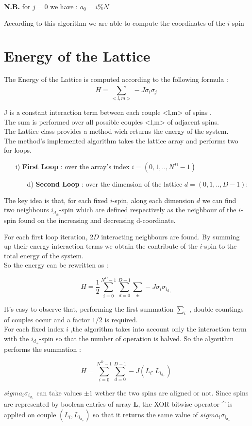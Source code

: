 \documentclass[11]{article}
\begin{document}
\textbf{N.B.} for $j=0$ we have : $a_0 = i\%N$	

According to this algorithm we are able to compute the coordinates of the $i$-spin


 
\section*{Energy of the Lattice} 

The Energy of the Lattice is computed according to the following formula : 
$$H = \sum_{<l,m>}^{} -J\sigma_i\sigma_j $$

\tab J is a constant interaction term between each couple <l,m> of spins .\\
\tab The sum is performed over all possible couples <l,m> of adjacent spins.\\

The Lattice class provides a method wich returns the energy of the system. \\
The method's implemented algorithm takes the lattice array and performs two for loops. \\
\begin{enumerate}
\item[i)] \textbf{First Loop} : over the array's index $i = (0,1,..,N^D-1)$ 
	\begin{enumerate}
	\item[d)] \textbf{Second Loop} : over the dimension of the lattice $d = (0,1,..,D-1)$: 
	\end{enumerate}	
\end{enumerate}


The key idea is that, for each fixed $i$-spin, along each dimension $d$ we can find two neighbours $i_{d_\pm}$-spin which are defined respectively as the neighbour of the $i$-spin found on the increasing and decreasing d-coordinate.   

For each first loop iteration, $2D$ interacting neighbours are found. By summing up their energy interaction terms we obtain the contribute of the $i$-spin to the total energy of the system. \\
So the energy can be rewritten as : 

$$H = \frac{1}{2}\sum_{i=0}^{N^D-1}\sum_{d=0}^{D-1}\sum_{\pm}^{} -J\sigma_i\sigma_{i_{d_\pm}}$$ 

It's easy to observe that, performing the first summation $\sum_{i}^{}$ , double countings of couples occur and a factor $1/2$ is required. \\ 
For each fixed index $i$ ,the algorithm takes into account only the interaction term with the 
$i_{d_+}$-spin so that the number of operation is halved. So the algorithm performs the summation :
  
$$H = \sum_{i=0}^{N^D-1}\sum_{d=0}^{D-1}-J(L_i \ \hat{} \ L_{i_{d_+}})$$ 

$sigma_i\sigma_{i_{d_+}}$ can take values $\pm1$ wether the two spins are aligned or not. Since spins are represented by boolean entries of array $\mathbf{L}$, the XOR bitwise operator ^ is applied on couple $(L_i,L_{i_{d_+}})$ so that it returns the same value of $sigma_i\sigma_{i_{d_+}}$   
      
\end{document}

